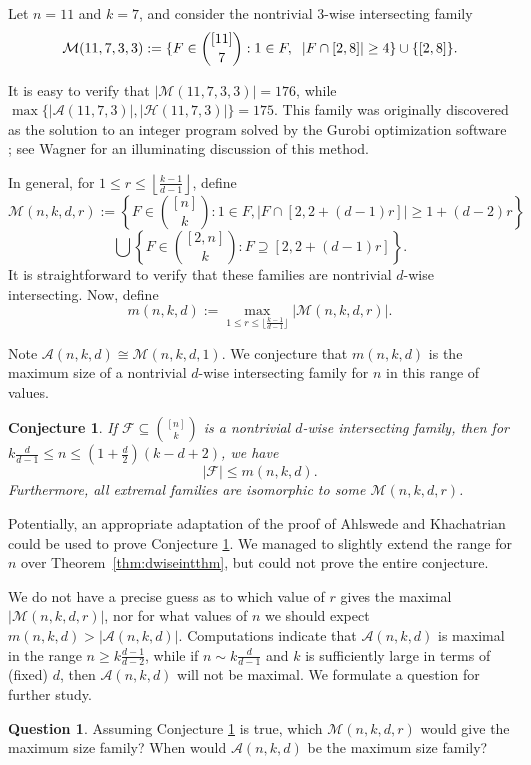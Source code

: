 \documentclass[12pt]{article}
\newtheorem{conjecture}{Conjecture}
\theoremstyle{definition}
\newtheorem{question}{Question}
\newcommand{\cH}{\mathcal{H}}
\newcommand{\cA}{\mathcal{A}}
\newcommand{\cF}{\mathcal{F}}
\newcommand{\cM}{\mathcal{M}}
\begin{document}
Let $n=11$ and $k=7$, and consider the nontrivial $3$-wise intersecting family 
\[\cM(11, 7, 3, 3):= \{F \in \binom{[11]}{7}: 1\in F, \hspace{2mm} |F\cap [2, 8]|\ge 4\} \cup \{[2, 8]\}.\]

It is easy to verify that $|\cM(11, 7, 3, 3)| = 176$, while $\max\{|\cA(11, 7, 3)|, |\cH(11, 7, 3)|\} = 175$. This family was originally discovered as the solution to an integer program solved by the Gurobi optimization software \cite{G}; see Wagner \cite{W} for an illuminating discussion of this method. 

In general, for $1\le r \le \left\lfloor{\frac{k-1}{d-1}}\right\rfloor$, define
\[\cM(n, k, d, r):= \left\{F \in \binom{[n]}{k}: 1\in F, |F \cap [2, 2+(d-1)r]| \ge 1+(d-2)r\right\} \] \[\bigcup \left\{F \in\binom{[2, n]}{k}: F \supseteq [2, 2+(d-1)r]\right\}. \]
It is straightforward to verify that these families are nontrivial $d$-wise intersecting. Now, define 
\[m(n, k, d):= \max_{1\le r\le \lfloor{\frac{k-1}{d-1}\rfloor}} |\cM(n, k, d, r)|. \]

Note $\cA(n, k, d) \cong \cM(n, k, d, 1)$. We conjecture that $m(n, k, d)$ is the maximum size of a nontrivial $d$-wise intersecting family for $n$ in this range of values.

\begin{conjecture}\label{conj:dwiseintconj}
If $\cF \subseteq \binom{[n]}{k}$ is a nontrivial $d$-wise intersecting family, then for $k\frac{d}{d-1}\le n \le \left(1+\frac{d}{2}\right)(k-d+2)$, we have 
\[|\cF| \le m(n, k, d).\]
Furthermore, all extremal families are isomorphic to some $\cM(n, k, d, r)$. 
\end{conjecture}

Potentially, an appropriate adaptation of the proof of Ahlswede and Khachatrian \cite{AK2} could be used to prove Conjecture \ref{conj:dwiseintconj}. We managed to slightly extend the range for $n$ over Theorem~\ref{thm:dwiseintthm}, but could not prove the entire conjecture.

We do not have a precise guess as to which value of $r$ gives the maximal $|\cM(n, k, d, r)|$, nor for what values of $n$ we should expect $m(n, k, d) > |\cA(n, k, d)|$. Computations indicate that $\cA(n, k, d)$ is maximal in the range $n \ge k\frac{d-1}{d-2}$, while if $n \sim k \frac{d}{d-1}$ and $k$ is sufficiently large in terms of (fixed) $d$, then $\cA(n, k, d)$ will not be maximal. We formulate a question for further study.

\begin{question}\label{ques:dwiseintques}
Assuming Conjecture \ref{conj:dwiseintconj} is true, which $\cM(n, k, d, r)$ would give the maximum size family? When would $\cA(n, k, d)$ be the maximum size family?
\end{question}
\end{document}
